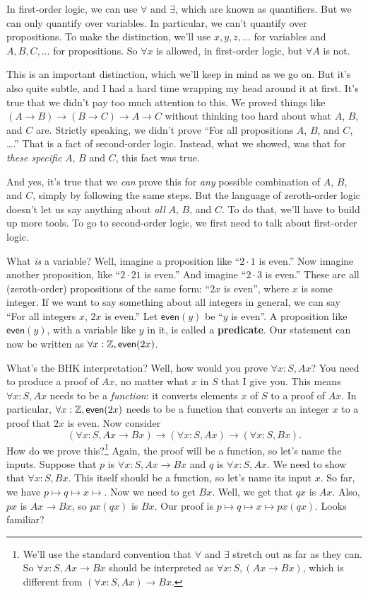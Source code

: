 \documentclass[11pt,paper=letter]{scrartcl}
\renewcommand{\sf}{\mathsf}
\begin{document}
In first-order logic, we can use $\forall$ and $\exists$, which are known as quantifiers. But we can only quantify over variables. In particular, we can't quantify over propositions. To make the distinction, we'll use $x, y, z, \dots$ for variables and $A, B, C, \dots$ for propositions. So $\forall x$ is allowed, in first-order logic, but $\forall A$ is not.

This is an important distinction, which we'll keep in mind as we go on. But it's also quite subtle, and I had a hard time wrapping my head around it at first. It's true that we didn't pay too much attention to this. We proved things like $(A \to B) \to (B \to C) \to A \to C$ without thinking too hard about what $A$, $B$, and $C$ are. Strictly speaking, we didn't prove ``For all propositions $A$, $B$, and $C$, \dots.'' That is a fact of second-order logic. Instead, what we showed, was that for \emph{these specific} $A$, $B$ and $C$, this fact was true.

And yes, it's true that we \emph{can} prove this for \emph{any} possible combination of $A$, $B$, and $C$, simply by following the same steps. But the language of zeroth-order logic doesn't let us say anything about \emph{all} $A$, $B$, and $C$. To do that, we'll have to build up more tools. To go to second-order logic, we first need to talk about first-order logic.

What \emph{is} a variable? Well, imagine a proposition like ``$2\cdot1$ is even.'' Now imagine another proposition, like ``$2\cdot21$ is even.'' And imagine ``$2\cdot3$ is even.'' These are all (zeroth-order) propositions of the same form: ``$2x$ is even'', where $x$ is some integer. If we want to say something about all integers in general, we can say ``For all integers $x$, $2x$ is even.'' Let $\sf{even}(y)$ be ``$y$ is even''. A proposition like $\sf{even}(y)$, with a variable like $y$ in it, is called a \textbf{predicate}. Our statement can now be written as $\forall x: \ZZ, \sf{even}(2x)$.

What's the BHK interpretation? Well, how would you prove $\forall x: S, Ax$? You need to produce a proof of $Ax$, no matter what $x$ in $S$ that I give you. This means $\forall x: S, Ax$ needs to be a \emph{function}: it converts elements $x$ of $S$ to a proof of $Ax$. In particular, $\forall x: \ZZ, \sf{even}(2x)$ needs to be a function that converts an integer $x$ to a proof that $2x$ is even. Now consider \[
(\forall x:S, Ax \to Bx) \to (\forall x:S, Ax) \to (\forall x:S, Bx).\] How do we prove this?\footnote{We'll use the standard convention that $\forall$ and $\exists$ stretch out as far as they can. So $\forall x: S, Ax \to Bx$ should be interpreted as $\forall x: S, (Ax \to Bx)$, which is different from $(\forall x: S, Ax) \to Bx$.} Again, the proof will be a function, so let's name the inputs. Suppose that $p$ is $\forall x:S, Ax\to Bx$ and $q$ is $\forall x:S, Ax$. We need to show that $\forall x:S, Bx$. This itself should be a function, so let's name its input $x$. So far, we have $p \mapsto q \mapsto x \mapsto $. Now we need to get $Bx$. Well, we get that $qx$ is $Ax$. Also, $px$ is $Ax \to Bx$, so $px(qx)$ is $Bx$. Our proof is $p \mapsto q \mapsto x \mapsto px(qx)$. Looks familiar?
\end{document}
